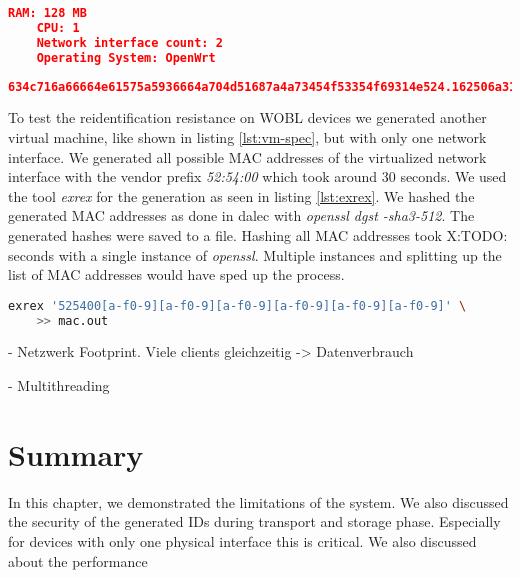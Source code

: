     \begin{lstlisting}[language=json, caption=virtual machine specifications, label=lst:vm-spec]
    RAM: 128 MB
    CPU: 1
    Network interface count: 2
    Operating System: OpenWrt
    \end{lstlisting}

    \begin{lstlisting}[language=json, caption=Layout of dalec message, label=lst:message]
634c716a66664e61575a5936664a704d51687a4a73454f53354f69314e524.162506a310a636136794752496d36794c5352626a6a464d765532636f4835.7258694279492b6b714c65507138426667596a31382b597a756d544267643.EPfGiM9IJpDHQQMaItynBRlJpusUP0KA-7-8.owrt.sviks.de
    \end{lstlisting}    
    
    To test the reidentification resistance on WOBL devices we generated another virtual machine, like shown in listing \ref{lst:vm-spec}, but with only one network interface. 
    We generated all possible MAC addresses of the virtualized network interface with the vendor prefix \textit{52:54:00} which took around 30 seconds. We used the tool \textit{exrex} \cite{tauber_asciimooexrex_2021} for the generation as seen in listing \ref{lst:exrex}. We hashed the generated MAC addresses as done in dalec with \textit{openssl dgst -sha3-512}. The generated hashes were saved to a file. Hashing all MAC addresses took X:TODO: seconds with a single instance of \textit{openssl}. Multiple instances and splitting up the list of MAC addresses would have sped up the process.
    
    \begin{lstlisting}[language=bash, caption=MAC generation with exrex, label=lst:message]
    exrex '525400[a-f0-9][a-f0-9][a-f0-9][a-f0-9][a-f0-9][a-f0-9]' \
    >> mac.out
    \end{lstlisting}    
    

- Netzwerk Footprint. Viele clients gleichzeitig -> Datenverbrauch

- Multithreading

\section{Summary}
In this chapter, we demonstrated the limitations of the system. We also discussed the security of the generated IDs during transport and storage phase. Especially for devices with only one physical interface this is critical. We also discussed about the performance 

